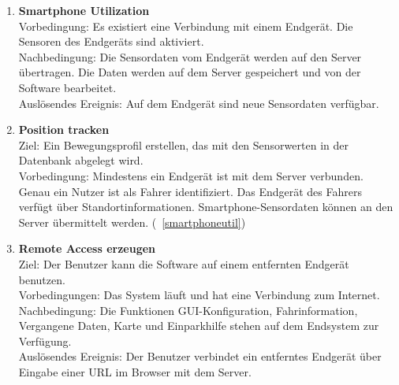 \documentclass[pflichtenheft.tex]{subfiles}
\begin{document}
\begin{enumerate}
		\item{\textbf{Smartphone Utilization}} \label{smartphoneutil} \\
		Vorbedingung: Es existiert eine Verbindung mit einem Endgerät. Die Sensoren des Endgeräts sind aktiviert. \\ Nachbedingung: Die Sensordaten vom Endgerät werden auf den Server übertragen. Die Daten werden auf dem Server gespeichert und von der Software bearbeitet. \\ Auslösendes Ereignis: Auf dem Endgerät sind neue Sensordaten verfügbar.

		\item{\textbf{Position tracken}}\\
		Ziel: Ein Bewegungsprofil erstellen, das mit den Sensorwerten in der Datenbank abgelegt wird.\\
		Vorbedingung: Mindestens ein Endgerät ist mit dem Server verbunden. Genau ein Nutzer ist als Fahrer identifiziert. Das Endgerät des Fahrers verfügt über Standortinformationen. Smartphone-Sensordaten können an den Server übermittelt werden. (~\ref{smartphoneutil})

		\renewcommand{\theenumi}{/FA\ifnum \value{enumi}<10 0\fi\arabic{enumi}0/}
		\renewcommand{\labelenumi}{\theenumi}
		\renewcommand{\theenumii}{\arabic{enumii}}
		\renewcommand{\labelenumii}{/FA\ifnum \value{enumi}<10 0\fi\arabic{enumi}\arabic{enumii}/}
		
		\item{\textbf{Remote Access erzeugen}} \label{remote} \\ Ziel: Der Benutzer kann die Software auf einem entfernten Endgerät benutzen.\\ Vorbedingungen: Das System läuft und hat eine Verbindung zum Internet.\\ Nachbedingung: Die Funktionen GUI-Konfiguration, Fahrinformation, Vergangene Daten, Karte und Einparkhilfe stehen auf dem Endsystem zur Verfügung.\\ Auslösendes Ereignis: Der Benutzer verbindet ein entferntes Endgerät über Eingabe einer URL im Browser mit dem Server.
		\setcounter{enumTemp}{\value{enumi}}
	\end{enumerate} 
\end{document}
